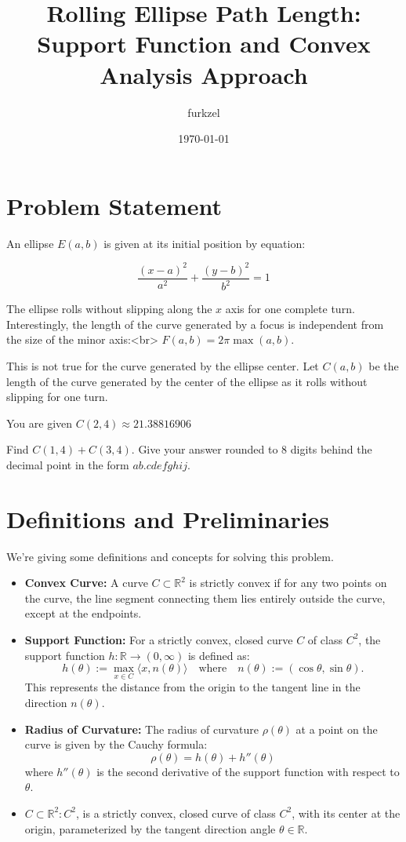 \documentclass[12pt]{article}
\title{Rolling Ellipse Path Length: Support Function and Convex Analysis Approach}
\author{furkzel}
\date{\today}
\theoremstyle{definition}
\begin{document}
\maketitle

\section{Problem Statement}
An ellipse $E(a, b)$ is given at its initial position by equation:

\[\frac{(x - a)^2}{a^2} + \frac{(y - b)^2}{b^2} = 1\]

The ellipse rolls without slipping along the $x$ axis for one complete turn. Interestingly, the length of the curve generated by a focus is independent from the size of the minor axis:<br> $F(a,b) = 2 \pi \max(a,b)$.

This is not true for the curve generated by the ellipse center. Let $C(a, b)$ be the length of the curve generated by the center of the ellipse as it rolls without slipping for one turn.

You are given $C(2, 4) \approx 21.38816906$

Find $C(1, 4) + C(3, 4)$. Give your answer rounded to $8$ digits behind the decimal point in the form $ab.cdefghij$.

\section{Definitions and Preliminaries}

We're giving some definitions and concepts for solving this problem.

\begin{itemize}
    \item \textbf{Convex Curve:} A curve $C \subset \mathbb{R}^2$ is strictly convex if for any two points on the curve, the line segment connecting them lies entirely outside the curve, except at the endpoints.
    \item \textbf{Support Function:} For a strictly convex, closed curve $C$ of class $C^2$, the support function $h: \mathbb{R} \to (0, \infty)$ is defined as:
          \[
              h(\theta) := \max_{x \in C} \langle x, n(\theta) \rangle \quad \text{where} \quad n(\theta) := (\cos \theta, \sin \theta).
          \]
          This represents the distance from the origin to the tangent line in the direction $n(\theta)$.
    \item \textbf{Radius of Curvature:} The radius of curvature $\rho(\theta)$ at a point on the curve is given by the Cauchy formula:
          \[
              \rho(\theta) = h(\theta) + h''(\theta)
          \]
          where $h''(\theta)$ is the second derivative of the support function with respect to $\theta$.
    \item $C \subset \mathbb{R}^2:C^2$, is a strictly convex, closed curve of class $ C^2 $, with its center at the origin, parameterized by the tangent direction angle $ \theta \in \mathbb{R} $.
\end{itemize}
\end{document}
